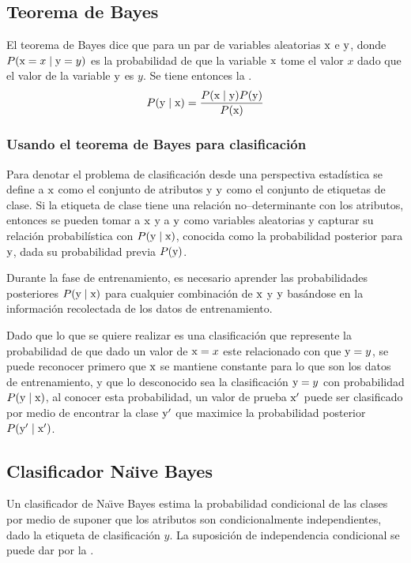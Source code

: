 \subsection{Teorema de Bayes} \label{subsec:bayestheo}
El teorema de Bayes dice que para un par de variables aleatorias ${\textnormal{x}}$ e ${\textnormal{y}}$, donde $P({\textnormal{x}}=x \mid {\textnormal{y}}=y)$ es la probabilidad de que la variable ${\textnormal{x}}$ tome el valor $x$ dado que el valor de la variable ${\textnormal{y}}$ es $y$. Se tiene entonces la .
\begin{equation} \label{eq:bayestheo}
  P({\textnormal{y}} \mid {\textnormal{x}}) = \frac{P({\textnormal{x}} \mid {\textnormal{y}}) P({\textnormal{y}})}{P({\textnormal{x}})}
\end{equation}

\subsubsection{Usando el teorema de Bayes para clasificación}
Para denotar el problema de clasificación desde una perspectiva estadística se define a ${\textnormal{x}}$ como el conjunto de atributos y ${\textnormal{y}}$ como el conjunto de etiquetas de clase. Si la etiqueta de clase tiene una relación no--determinante con los atributos, entonces se pueden tomar a ${\textnormal{x}}$ y a ${\textnormal{y}}$ como variables aleatorias y capturar su relación probabilística con $P({\textnormal{y}}\mid{\textnormal{x}})$, conocida como la probabilidad posterior para ${\textnormal{y}}$, dada su probabilidad previa $P({\textnormal{y}})$.

Durante la fase de entrenamiento, es necesario aprender las probabilidades posteriores $P({\textnormal{y}}\mid{\textnormal{x}})$ para cualquier combinación de ${\textnormal{x}}$ y ${\textnormal{y}}$ basándose en la información recolectada de los datos de entrenamiento.

Dado que lo que se quiere realizar es una clasificación que represente la probabilidad de que dado un valor de ${\textnormal{x}}=x$ este relacionado con que ${\textnormal{y}}=y$, se puede reconocer primero que ${\textnormal{x}}$ se mantiene constante para lo que son los datos de entrenamiento, y que lo desconocido sea la clasificación ${\textnormal{y}}=y$ con probabilidad $P({\textnormal{y}}\mid{\textnormal{x}})$, al conocer esta probabilidad, un valor de prueba ${\textnormal{x}}'$ puede ser clasificado por medio de encontrar la clase ${\textnormal{y}}'$ que maximice la probabilidad posterior $P({\textnormal{y}}'\mid{\textnormal{x}}')$.


\subsection{Clasificador Na\"{\i}ve Bayes} \label{subsec:naivebayes}
Un clasificador de Na\"{\i}ve Bayes estima la probabilidad condicional de las clases por medio de suponer que los atributos son condicionalmente independientes, dado la etiqueta de clasificación $y$. La suposición de independencia condicional se puede dar por la .

